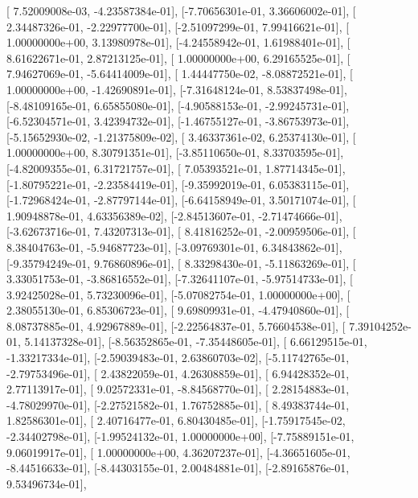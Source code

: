 \documentclass{article}
\begin{document}
       [ 7.52009008e-03, -4.23587384e-01],
       [-7.70656301e-01,  3.36606002e-01],
       [ 2.34487326e-01, -2.22977700e-01],
       [-2.51097299e-01,  7.99416621e-01],
       [ 1.00000000e+00,  3.13980978e-01],
       [-4.24558942e-01,  1.61988401e-01],
       [ 8.61622671e-01,  2.87213125e-01],
       [ 1.00000000e+00,  6.29165525e-01],
       [ 7.94627069e-01, -5.64414009e-01],
       [ 1.44447750e-02, -8.08872521e-01],
       [ 1.00000000e+00, -1.42690891e-01],
       [-7.31648124e-01,  8.53837498e-01],
       [-8.48109165e-01,  6.65855080e-01],
       [-4.90588153e-01, -2.99245731e-01],
       [-6.52304571e-01,  3.42394732e-01],
       [-1.46755127e-01, -3.86753973e-01],
       [-5.15652930e-02, -1.21375809e-02],
       [ 3.46337361e-02,  6.25374130e-01],
       [ 1.00000000e+00,  8.30791351e-01],
       [-3.85110650e-01,  8.33703595e-01],
       [-4.82009355e-01,  6.31721757e-01],
       [ 7.05393521e-01,  1.87714345e-01],
       [-1.80795221e-01, -2.23584419e-01],
       [-9.35992019e-01,  6.05383115e-01],
       [-1.72968424e-01, -2.87797144e-01],
       [-6.64158949e-01,  3.50171074e-01],
       [ 1.90948878e-01,  4.63356389e-02],
       [-2.84513607e-01, -2.71474666e-01],
       [-3.62673716e-01,  7.43207313e-01],
       [ 8.41816252e-01, -2.00959506e-01],
       [ 8.38404763e-01, -5.94687723e-01],
       [-3.09769301e-01,  6.34843862e-01],
       [-9.35794249e-01,  9.76860896e-01],
       [ 8.33298430e-01, -5.11863269e-01],
       [ 3.33051753e-01, -3.86816552e-01],
       [-7.32641107e-01, -5.97514733e-01],
       [ 3.92425028e-01,  5.73230096e-01],
       [-5.07082754e-01,  1.00000000e+00],
       [ 2.38055130e-01,  6.85306723e-01],
       [ 9.69809931e-01, -4.47940860e-01],
       [ 8.08737885e-01,  4.92967889e-01],
       [-2.22564837e-01,  5.76604538e-01],
       [ 7.39104252e-01,  5.14137328e-01],
       [-8.56352865e-01, -7.35448605e-01],
       [ 6.66129515e-01, -1.33217334e-01],
       [-2.59039483e-01,  2.63860703e-02],
       [-5.11742765e-01, -2.79753496e-01],
       [ 2.43822059e-01,  4.26308859e-01],
       [ 6.94428352e-01,  2.77113917e-01],
       [ 9.02572331e-01, -8.84568770e-01],
       [ 2.28154883e-01, -4.78029970e-01],
       [-2.27521582e-01,  1.76752885e-01],
       [ 8.49383744e-01,  1.82586301e-01],
       [ 2.40716477e-01,  6.80430485e-01],
       [-1.75917545e-02, -2.34402798e-01],
       [-1.99524132e-01,  1.00000000e+00],
       [-7.75889151e-01,  9.06019917e-01],
       [ 1.00000000e+00,  4.36207237e-01],
       [-4.36651605e-01, -8.44516633e-01],
       [-8.44303155e-01,  2.00484881e-01],
       [-2.89165876e-01,  9.53496734e-01],
\end{document}
